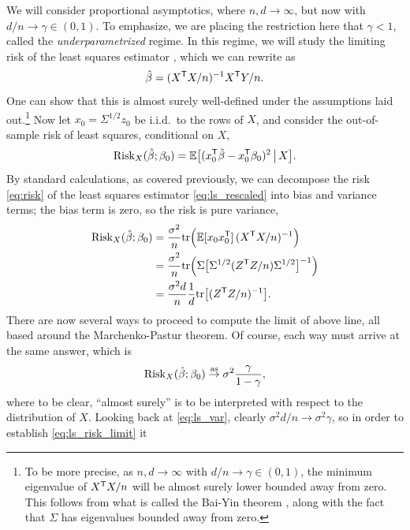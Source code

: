 \documentclass{article}
\begin{document}
We will consider proportional asymptotics, where $n,d \to \infty$, but now with
$d/n \to \gamma \in (0,1)$. To emphasize, we are placing the restriction here
that $\gamma < 1$, called the \emph{underparametrized} regime. In this regime,
we will study the limiting risk of the least squares estimator , which we can rewrite as   
\begin{equation}
\label{eq:ls_rescaled}
\hat{\beta} = (X^{\mathsf{T}} X/n)^{-1} X^{\mathsf{T}} Y/n.
\end{equation}
One can show that this is almost surely well-defined under the assumptions laid
out.\footnote{To be more precise, as $n,d \to \infty$ with $d/n \to \gamma \in
  (0,1)$, the minimum eigenvalue of $X^{\mathsf{T}} X/n$ will be almost surely lower
  bounded away from zero. This follows from what is called the Bai-Yin theorem 
  \citep{bai1993limit}, along with the fact that $\Sigma$ has eigenvalues
  bounded away from zero.}  
Now let $x_0 = \Sigma^{1/2} z_0$ be i.i.d.\ to the rows of $X$, and consider the
out-of-sample risk of least squares, conditional on $X$,
\begin{equation}
\label{eq:risk}
\mathrm{Risk}_X(\hat{\beta}; \beta_0) = \mathbb{E} \big[ ( x_0^{\mathsf{T}} \hat{\beta} - x_0^{\mathsf{T}} \beta_0 )^2
\,\big|\, X \big].
\end{equation}
By standard calculations, as covered previously, we can decompose the risk
\eqref{eq:risk} of the least squares estimator \eqref{eq:ls_rescaled} into bias
and variance terms; the bias term is zero, so the risk is pure variance,      
\begin{align}
\nonumber
\mathrm{Risk}_X(\hat{\beta}; \beta_0) 
&= \frac{\sigma^2}{n} \mathrm{tr}\Big(\mathbb{E} [x_0 x_0^{\mathsf{T}}] \, (X^{\mathsf{T}} X/n)^{-1} \Big) \\
\nonumber
&= \frac{\sigma^2}{n}\mathrm{tr}\Big(\Sigma \big[ \Sigma^{1/2} (Z^{\mathsf{T}} Z/n) \Sigma^{1/2} 
  \big]^{-1} \Big) \\ 
\label{eq:ls_var}
&= \frac{\sigma^2 d}{n} \frac{1}{d} \mathrm{tr} \big[ (Z^{\mathsf{T}} Z/n)^{-1} \big].
\end{align}
There are now several ways to proceed to compute the limit of above line, all
based around the Marchenko-Pastur theorem. Of course, each way must arrive at
the same answer, which is
\begin{equation}
\label{eq:ls_risk_limit}
\mathrm{Risk}_X(\hat{\beta}; \beta_0) \overset{\mathrm{as}}{\to} \sigma^2 \frac{\gamma}{1-\gamma},
\end{equation}
where to be clear, ``almost surely'' is to be interpreted with respect to the
distribution of $X$. Looking back at \eqref{eq:ls_var}, clearly $\sigma^2 d/n
\to \sigma^2 \gamma$, so in order to establish \eqref{eq:ls_risk_limit} it
\end{document}

